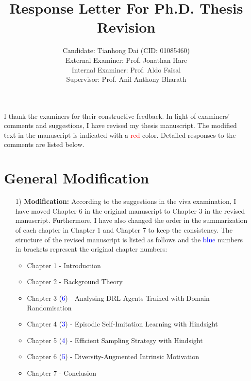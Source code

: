 \documentclass[11pt]{article}
\title{Response Letter For Ph.D. Thesis Revision}
\author{Candidate: Tianhong Dai (CID: 01085460) \\ External Examiner: Prof. Jonathan Hare \\ Internal Examiner: Prof. Aldo Faisal \\ Supervisor: Prof. Anil Anthony Bharath}
\date{}
\newcommand{\td}[1]{\textcolor{red}{#1}}
\begin{document}
\onehalfspacing
\maketitle

\noindent I thank the examiners for their constructive feedback. In light of examiners' comments and suggestions, I have revised my thesis manuscript. The modified text in the manuscript is indicated with a \td{red} color. Detailed responses to the comments are listed below.

\section*{General Modification}
\begin{enumerate}
\item[1)] \textbf{Modification:} According to the suggestions in the viva examination, I have moved Chapter 6 in the original manuscript to Chapter 3 in the revised manuscript. Furthermore, I have also changed the order in the summarization of each chapter in Chapter 1 and Chapter 7 to keep the consistency. The structure of the revised manuscript is listed as follows and the \textcolor{blue}{blue} numbers in brackets represent the original chapter numbers:
\begin{itemize}
    \item Chapter 1 - Introduction
    \item Chapter 2 - Background Theory
    \item Chapter 3 (\textcolor{blue}{6}) - Analysing DRL Agents Trained with Domain Randomisation
    \item Chapter 4 (\textcolor{blue}{3}) - Episodic Self-Imitation Learning with Hindsight
    \item Chapter 5 (\textcolor{blue}{4}) - Efficient Sampling Strategy with Hindsight
    \item Chapter 6 (\textcolor{blue}{5}) - Diversity-Augmented Intrinsic Motivation
    \item Chapter 7 - Conclusion
\end{itemize}


\end{enumerate}
\newpage
\end{document}
